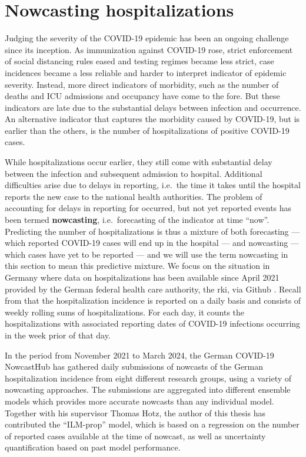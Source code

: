 \section{Nowcasting hospitalizations}%
\label{sec:nowcasting_hospitalizations}
Judging the severity of the COVID-19 epidemic has been an ongoing challenge since its inception. As immunization against COVID-19 rose, strict enforcement of social distancing rules eased and testing regimes became less strict, case incidences became a less reliable and harder to interpret indicator of epidemic severity. Instead, more direct indicators of morbidity, such as the number of deaths and ICU admissions and occupancy have come to the fore. But these indicators are late due to the substantial delays between infection and occurrence. An alternative indicator that captures the morbidity caused by COVID-19, but is earlier than the others, is the number of hospitalizations of positive COVID-19 cases.

While hospitalizations occur earlier, they still come with substantial delay between the infection and subsequent admission to hospital. Additional difficulties arise due to delays in reporting, i.e.~the time it takes until the hospital reports the new case to the national health authorities. The problem of accounting for delays in reporting for occurred, but not yet reported events has been termed \textbf{nowcasting}, i.e.~forecasting of the indicator at time ``now''. Predicting the number of hospitalizations is thus a mixture of both forecasting --- which reported COVID-19 cases will end up in the hospital --- and nowcasting --- which cases have yet to be reported --- and we will use the term nowcasting in this section to mean this predictive mixture. We focus on the situation in Germany where data on hospitalizations has been available since April 2021 provided by the German federal health care authority, the \gls{rki}, via Github \citep{RobertKoch-Institut2021COVID19Hospitalisierungen}. Recall from  that the hospitalization incidence is reported on a daily basis and consists of weekly rolling sums of hospitalizations. For each day, it counts the hospitalizations with associated reporting dates of COVID-19 infections occurring in the week prior of that day. 

In the period from November 2021 to March 2024, the German COVID-19 NowcastHub \citep{Wolffram2023Collaborative} has gathered daily submissions of nowcasts of the German hospitalization incidence from eight different research groups, using a variety of nowcasting approaches. The submissions are aggregated into different ensemble models which provides more accurate nowcasts than any individual model. Together with his supervisor Thomas Hotz, the author of this thesis has contributed the ``{}ILM-prop''{} model, which is based on a regression on the number of reported cases available at the time of nowcast, as well as uncertainty quantification based on past model performance. 


